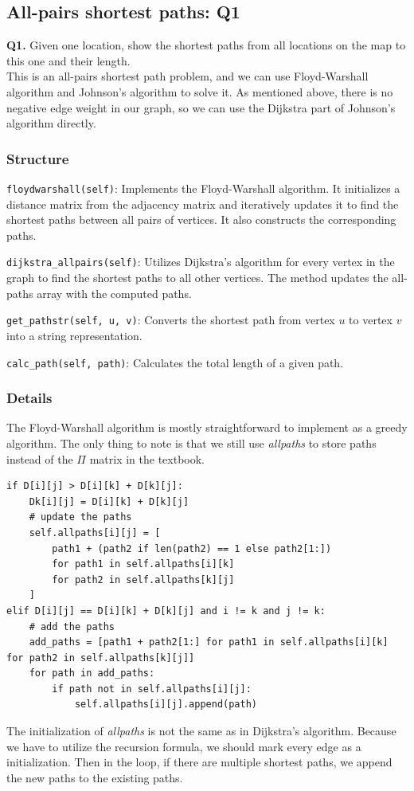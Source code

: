 \documentclass[UTF8]{ctexart}
\begin{document}
\subsection{All-pairs shortest paths: Q1}
\textbf{Q1.} Given one location, show the shortest paths from all locations on the
map to this one and their length.\\
This is an all-pairs shortest path problem, and we can use Floyd-Warshall algorithm and Johnson's algorithm to solve it.
As mentioned above, there is no negative edge weight in our graph, so we can use the Dijkstra part of Johnson's algorithm directly.

\subsubsection*{Structure}
\texttt{floydwarshall(self)}: Implements the Floyd-Warshall algorithm. It initializes a distance matrix from the adjacency matrix and iteratively updates it to find the shortest paths between all pairs of vertices. It also constructs the corresponding paths.

\texttt{dijkstra\_allpairs(self)}: Utilizes Dijkstra's algorithm for every vertex in the graph to find the shortest paths to all other vertices. The method updates the all-paths array with the computed paths.

\texttt{get\_pathstr(self, u, v)}: Converts the shortest path from vertex \( u \) to vertex \( v \) into a string representation.

\texttt{calc\_path(self, path)}: Calculates the total length of a given path.

\subsubsection*{Details}
The Floyd-Warshall algorithm is mostly straightforward to implement as a greedy algorithm.
The only thing to note is that we still use \textit{allpaths} to store paths instead of the $\Pi$ matrix in the textbook.
\begin{lstlisting}
if D[i][j] > D[i][k] + D[k][j]:
    Dk[i][j] = D[i][k] + D[k][j]
    # update the paths
    self.allpaths[i][j] = [
        path1 + (path2 if len(path2) == 1 else path2[1:])
        for path1 in self.allpaths[i][k]
        for path2 in self.allpaths[k][j]
    ]
elif D[i][j] == D[i][k] + D[k][j] and i != k and j != k:
    # add the paths
    add_paths = [path1 + path2[1:] for path1 in self.allpaths[i][k] for path2 in self.allpaths[k][j]]
    for path in add_paths:
        if path not in self.allpaths[i][j]:
            self.allpaths[i][j].append(path)
\end{lstlisting}
The initialization of \textit{allpaths} is not the same as in Dijkstra's algorithm. Because we have to
utilize the recursion formula, we should mark every edge as a initialization. Then in the loop, if there are multiple shortest paths,
we append the new paths to the existing paths.\\
\end{document}
